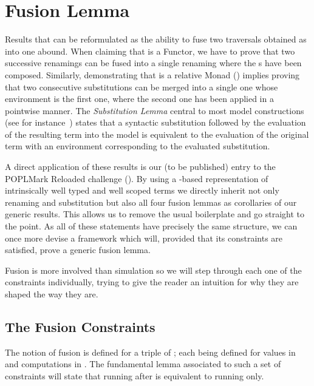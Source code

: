 \section{Fusion Lemma}\label{section:fusion}

Results that can be reformulated as the ability to fuse two traversals
obtained as  into one abound. When claiming that  is
a Functor, we have to prove that two successive renamings can be fused into
a single renaming where the s have been composed. Similarly,
demonstrating that  is a relative Monad (\cite{JFR4389}) implies proving
that two consecutive substitutions can be merged into a single one whose
environment is the first one, where the second one has been applied in a
pointwise manner. The \emph{Substitution Lemma} central
to most model constructions (see for instance~\cite{mitchell1991kripke}) states
that a syntactic substitution followed by the evaluation of the resulting term
into the model is equivalent to the evaluation of the original term with an
environment corresponding to the evaluated substitution.

A direct application of these results is our (to be published) entry to the
POPLMark Reloaded challenge (\citeyear{poplmarkreloaded}). By using a
-based representation of intrinsically well typed and well scoped
terms we directly inherit not only renaming and substitution but also all
four fusion lemmas as corollaries
of our generic results. This allows us to remove the usual boilerplate
and go straight to the point.
As all of these statements have precisely the same structure, we can
once more devise a framework which will, provided that its constraints are
satisfied, prove a generic fusion lemma.

Fusion is more involved than simulation so we will step through
each one of the constraints individually, trying to give the reader an intuition
for why they are shaped the way they are.


\subsection{The Fusion Constraints}

The notion of fusion is defined for a triple of ; each 
being defined for values in  and computations in . The
fundamental lemma associated to such a set of constraints will state that
running  after  is equivalent to running  only.

